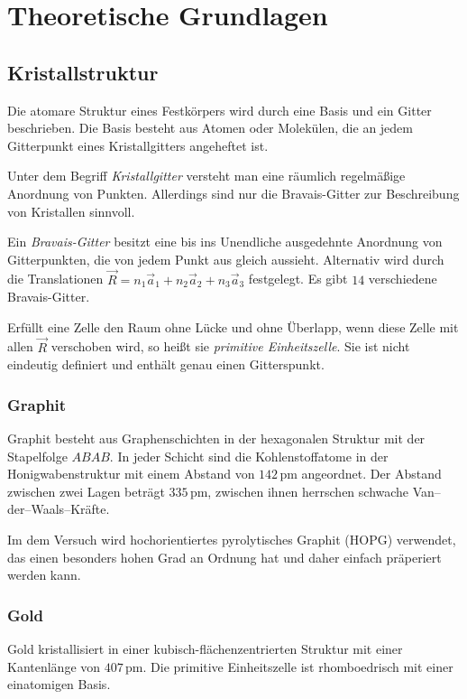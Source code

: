 \documentclass[12pt,a4paper]{scrartcl}
\numberwithin{equation}{section} %
\begin{document}
\clearpage
\hypertarget{theoretische-grundlagen}{%
\section{Theoretische Grundlagen}\label{theoretische-grundlagen}}

\hypertarget{kristallstruktur}{%
	\subsection{Kristallstruktur}\label{kristallstruktur}}
Die atomare Struktur eines Festkörpers wird durch eine Basis und ein Gitter beschrieben. Die Basis besteht aus Atomen oder Molekülen, die an jedem Gitterpunkt eines Kristallgitters angeheftet ist.

Unter dem Begriff \textit{Kristallgitter} versteht man eine räumlich regelmäßige Anordnung von Punkten. Allerdings sind nur die Bravais-Gitter zur Beschreibung von Kristallen sinnvoll.

Ein \textit{Bravais-Gitter} besitzt eine bis ins Unendliche ausgedehnte Anordnung von Gitterpunkten, die von jedem Punkt aus gleich aussieht. Alternativ wird durch die Translationen $\vec{R} = n_1\vec{a}_1 + n_2\vec{a}_2 + n_3\vec{a}_3$ festgelegt. Es gibt $14$ verschiedene Bravais-Gitter.

Erfüllt eine Zelle den Raum ohne Lücke und ohne Überlapp, wenn diese Zelle mit allen $\vec{R}$
verschoben wird, so heißt sie \textit{primitive Einheitszelle}. Sie ist nicht eindeutig definiert und enthält genau einen Gitterspunkt.

\hypertarget{graphitstruktur}{%
\subsubsection{Graphit}\label{graphitstruktur}}
Graphit besteht aus Graphenschichten in der hexagonalen Struktur mit der Stapelfolge $ABAB$. In jeder Schicht sind die Kohlenstoffatome in der Honigwabenstruktur mit einem Abstand von $142\mathrm{\,pm}$ angeordnet. Der Abstand zwischen zwei Lagen beträgt $335\mathrm{\,pm}$, zwischen ihnen herrschen schwache Van--der--Waals--Kräfte.

Im dem Versuch wird hochorientiertes pyrolytisches Graphit (HOPG) verwendet, das einen besonders hohen Grad an Ordnung hat und daher einfach präperiert werden kann.

\hypertarget{goldstruktur}{%
\subsubsection{Gold}\label{goldstruktur}}
Gold kristallisiert in einer kubisch-flächenzentrierten Struktur mit einer Kantenlänge von $407\mathrm{\,pm}$. Die primitive Einheitszelle ist rhomboedrisch mit einer einatomigen Basis.
\end{document}
